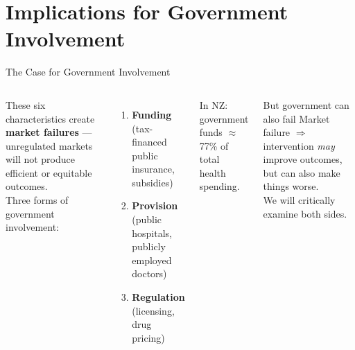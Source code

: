 \documentclass[aspectratio=169, 12pt]{beamer}
\begin{document}
\section{Implications for Government Involvement}

\begin{frame}{The Case for Government Involvement}
	\begin{columns}[T]
		{\small These six characteristics create \textbf{market failures} --- unregulated markets will not produce efficient or equitable outcomes.\\[0.3em]
		Three forms of government involvement:
		\begin{enumerate}\setlength{\itemsep}{0.1em}
			\item \textbf{Funding} (tax-financed public insurance, subsidies)
			\item \textbf{Provision} (public hospitals, publicly employed doctors)
			\item \textbf{Regulation} (licensing, drug pricing)
		\end{enumerate}
		\vspace{0.1em}
		In NZ: government funds $\approx$77\% of total health spending.}
		\begin{alertblock}{But government can also fail}
			{\small Market failure $\Rightarrow$ intervention \emph{may} improve outcomes, but can also make things worse.\\[0.2em]
			We will critically examine both sides.}
		\end{alertblock}
	\end{columns}
\end{frame}


\end{document}
